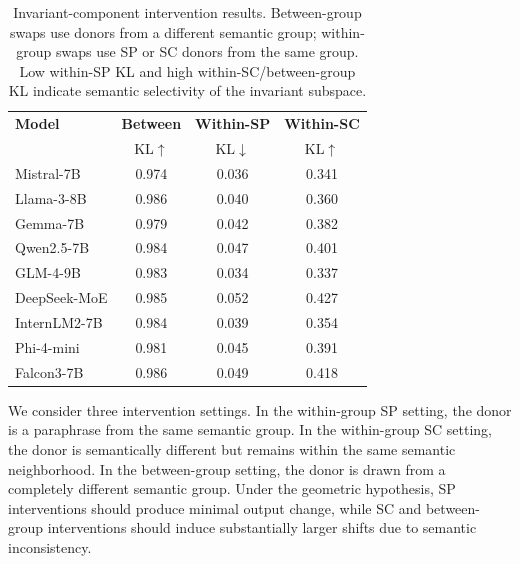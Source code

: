 \begin{table}
\vspace{+0.25em}
\centering
\footnotesize
\setlength{\tabcolsep}{3pt}
\renewcommand{\arraystretch}{1.1}
\begin{tabular}{lccc}
\toprule
\textbf{Model} 
& \textbf{Between} 
& \textbf{Within-SP} 
& \textbf{Within-SC} \\
& KL$\uparrow$ & KL$\downarrow$ & KL$\uparrow$ \\
\midrule
Mistral-7B       & 0.974 & 0.036 & 0.341 \\
Llama-3-8B       & 0.986 & 0.040 & 0.360 \\
Gemma-7B         & 0.979 & 0.042 & 0.382 \\
Qwen2.5-7B       & 0.984 & 0.047 & 0.401 \\
GLM-4-9B         & 0.983 & 0.034 & 0.337 \\
DeepSeek-MoE     & 0.985 & 0.052 & 0.427 \\
InternLM2-7B     & 0.984 & 0.039 & 0.354 \\
Phi-4-mini       & 0.981 & 0.045 & 0.391 \\
Falcon3-7B       & 0.986 & 0.049 & 0.418 \\
\bottomrule
\end{tabular}
\caption{Invariant-component intervention results. Between-group swaps use donors from a different semantic group; within-group swaps use SP or SC donors from the same group. Low within-SP KL and high within-SC/between-group KL indicate semantic selectivity of the invariant subspace.}
\label{tab:inv_intervention_combined}
\vspace{-1.5em}
\end{table}

We consider three intervention settings. In the within-group SP setting, the donor is a paraphrase from the same semantic group. In the within-group SC setting, the donor is semantically different but remains within the same semantic neighborhood. In the between-group setting, the donor is drawn from a completely different semantic group. Under the geometric hypothesis, SP interventions should produce minimal output change, while SC and between-group interventions should induce substantially larger shifts due to semantic inconsistency. 

